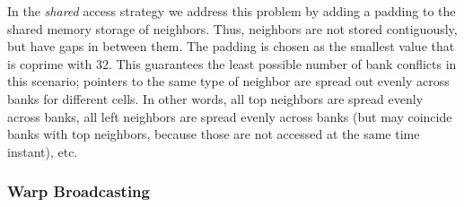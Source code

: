 In the \emph{shared} access strategy we address this problem by adding a padding to the shared memory storage of neighbors. Thus, neighbors are not stored contiguously, but have gaps in between them. The padding is chosen as the smallest value that is coprime with $32$. This guarantees the least possible number of bank conflicts in this scenario; pointers to the same type of neighbor are spread out evenly across banks for different cells. In other words, all top neighbors are spread evenly across banks, all left neighbors are spread evenly across banks (but may coincide banks with top neighbors, because those are not accessed at the same time instant), etc.

\subsubsection{Warp Broadcasting}

